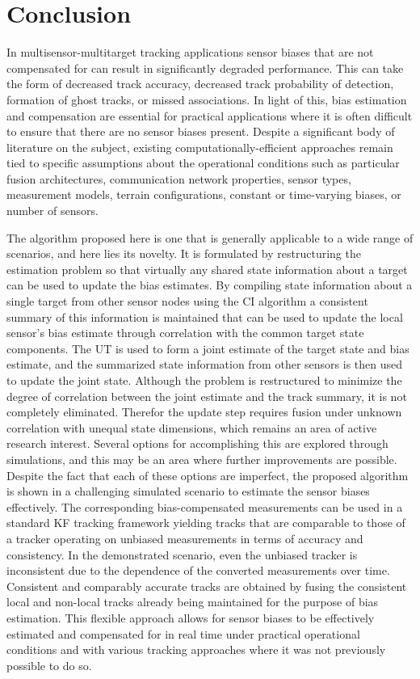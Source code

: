 \documentclass[journal]{IEEEtran}
\begin{document}
\section{Conclusion} \label{conclusion}
In multisensor-multitarget tracking applications sensor biases that are not compensated for can result in significantly degraded performance. This can take the form of decreased track accuracy, decreased track probability of detection, formation of ghost tracks, or missed associations. In light of this, bias estimation and compensation are essential for practical applications where it is often difficult to ensure that there are no sensor biases present. Despite a significant body of literature on the subject, existing computationally-efficient approaches remain tied to specific assumptions about the operational conditions such as particular fusion architectures, communication network properties, sensor types, measurement models, terrain configurations, constant or time-varying biases, or number of sensors.

The algorithm proposed here is one that is generally applicable to a wide range of scenarios, and here lies its novelty. It is formulated by restructuring the estimation problem so that virtually any shared state information about a target can be used to update the bias estimates. By compiling state information about a single target from other sensor nodes using the CI algorithm a consistent summary of this information is maintained that can be used to update the local sensor's bias estimate through correlation with the common target state components. The UT is used to form a joint estimate of the target state and bias estimate, and the summarized state information from other sensors is then used to update the joint state. Although the problem is restructured to minimize the degree of correlation between the joint estimate and the track summary, it is not completely eliminated. Therefor the update step requires fusion under unknown correlation with unequal state dimensions, which remains an area of active research interest. Several options for accomplishing this are explored through simulations, and this may be an area where further improvements are possible. Despite the fact that each of these options are imperfect, the proposed algorithm is shown in a challenging simulated scenario to estimate the sensor biases effectively. The corresponding bias-compensated measurements can be used in a standard KF tracking framework yielding tracks that are comparable to those of a tracker operating on unbiased measurements in terms of accuracy and consistency. In the demonstrated scenario, even the unbiased tracker is inconsistent due to the dependence of the converted measurements over time. Consistent and comparably accurate tracks are obtained by fusing the consistent local and non-local tracks already being maintained for the purpose of bias estimation. This flexible approach allows for sensor biases to be effectively estimated and compensated for in real time under practical operational conditions and with various tracking approaches where it was not previously possible to do so.




\end{document}
